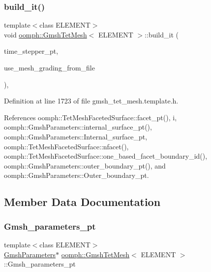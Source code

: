 \subsubsection{\texorpdfstring{build\+\_\+it()}{build\_it()}}
{\footnotesize\ttfamily template$<$class E\+L\+E\+M\+E\+NT$>$ \\
void \hyperlink{classoomph_1_1GmshTetMesh}{oomph\+::\+Gmsh\+Tet\+Mesh}$<$ E\+L\+E\+M\+E\+NT $>$\+::build\+\_\+it (\begin{DoxyParamCaption}\item[{\hyperlink{classoomph_1_1TimeStepper}{Time\+Stepper} $\ast$}]{time\+\_\+stepper\+\_\+pt,  }\item[{const bool \&}]{use\+\_\+mesh\+\_\+grading\+\_\+from\+\_\+file }\end{DoxyParamCaption})\hspace{0.3cm}{\ttfamily [inline]}, {\ttfamily [private]}}



Definition at line 1723 of file gmsh\+\_\+tet\+\_\+mesh.\+template.\+h.



References oomph\+::\+Tet\+Mesh\+Faceted\+Surface\+::facet\+\_\+pt(), i, oomph\+::\+Gmsh\+Parameters\+::internal\+\_\+surface\+\_\+pt(), oomph\+::\+Gmsh\+Parameters\+::\+Internal\+\_\+surface\+\_\+pt, oomph\+::\+Tet\+Mesh\+Faceted\+Surface\+::nfacet(), oomph\+::\+Tet\+Mesh\+Faceted\+Surface\+::one\+\_\+based\+\_\+facet\+\_\+boundary\+\_\+id(), oomph\+::\+Gmsh\+Parameters\+::outer\+\_\+boundary\+\_\+pt(), and oomph\+::\+Gmsh\+Parameters\+::\+Outer\+\_\+boundary\+\_\+pt.



\subsection{Member Data Documentation}
\mbox{\label{classoomph_1_1GmshTetMesh_a6d9878df9dfca45b4883909ed1e78536}} 
\subsubsection{\texorpdfstring{Gmsh\+\_\+parameters\+\_\+pt}{Gmsh\_parameters\_pt}}
{\footnotesize\ttfamily template$<$class E\+L\+E\+M\+E\+NT$>$ \\
\hyperlink{classoomph_1_1GmshParameters}{Gmsh\+Parameters}$\ast$ \hyperlink{classoomph_1_1GmshTetMesh}{oomph\+::\+Gmsh\+Tet\+Mesh}$<$ E\+L\+E\+M\+E\+NT $>$\+::Gmsh\+\_\+parameters\+\_\+pt\hspace{0.3cm}{\ttfamily [protected]}}



